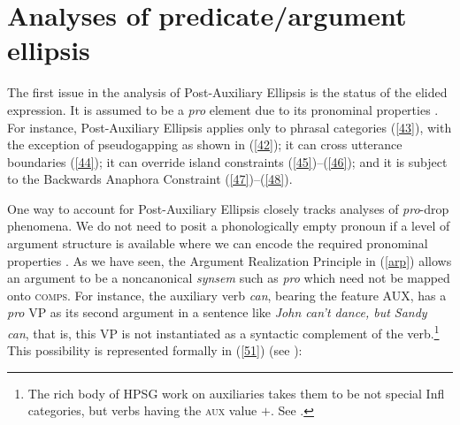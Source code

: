 \section{Analyses of predicate/argument ellipsis}
\label{sec-analyses-of-pred-ellipsis}

The first issue in the analysis of Post-Auxiliary Ellipsis is the status of the elided expression. It is assumed to be a
\textit{pro} element due to its pronominal properties \citep[see][]{Lobeck1995, Lopez2000, Kim2003,
  Aelbrecht2015, Ginzburg2018}. For instance, Post-Auxiliary Ellipsis applies only to phrasal categories (\ref{43}),
with the exception of pseudogapping as shown in (\ref{42}); it can cross utterance boundaries
(\ref{44}); it can override island constraints (\ref{45})--(\ref{46}); and it is subject to the
Backwards Anaphora Constraint (\ref{47})--(\ref{48}). 

\z
{}
\z
{}
\z
{}
\z
{}
\z
{}
\z
{}
\z

\largerpage
One way to account for Post-Auxiliary Ellipsis closely tracks analyses of \emph{pro}-drop phenomena. We do not need to posit a phonologically empty pronoun if a level of argument structure is
available where we can encode the required pronominal properties
\citep[see][330]{Ginzburg:Sag:2000}. As we have seen, the Argument Realization Principle in
(\ref{arp}) allows an argument to be a noncanonical  \emph{synsem}
such as \textit{pro} which need not be mapped onto \textsc{comps}. 
%
For instance, the auxiliary
verb \textit{can}, bearing the feature AUX, has a \textit{pro} VP as its second argument in a sentence like \textit{John can't dance, but Sandy can}, that is, this VP is not instantiated as a syntactic complement of the verb.\footnote{The rich body of HPSG work on  auxiliaries takes them to be not special Infl categories, but verbs having the \textsc{aux} value $+$. See \citet{Kim:00, KS2002a, Sag:Wasow:Bender:2003, Sag2020a, kimmichaelis:2020}.} This possibility is represented formally in (\ref{51}) 
(see \citealt{Kim2003, ginzburg-miller-ellipsis-handbook}):

